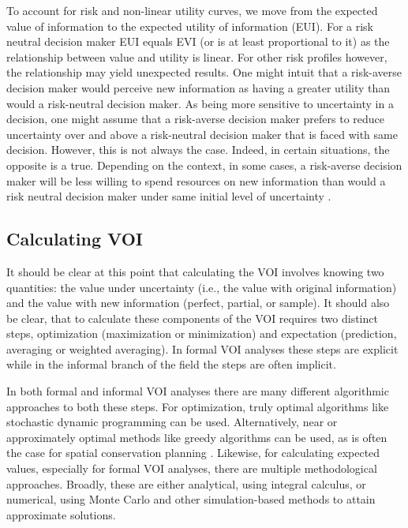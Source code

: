 \documentclass[]{article}
\theoremstyle{definition}
\theoremstyle{definition}
\theoremstyle{definition}
\theoremstyle{remark}
\begin{document}
To account for risk and non-linear utility curves, we move from the
expected value of information to the expected utility of information
(EUI). For a risk neutral decision maker EUI equals EVI (or is at least
proportional to it) as the relationship between value and utility is
linear. For other risk profiles however, the relationship may yield
unexpected results. One might intuit that a risk-averse decision maker
would perceive new information as having a greater utility than would a
risk-neutral decision maker. As being more sensitive to uncertainty in a
decision, one might assume that a risk-averse decision maker prefers to
reduce uncertainty over and above a risk-neutral decision maker that is
faced with same decision. However, this is not always the case. Indeed,
in certain situations, the opposite is a true. Depending on the context,
in some cases, a risk-averse decision maker will be less willing to
spend resources on new information than would a risk neutral decision
maker under same initial level of uncertainty \citep{Eeckhoudt2000}.

\subsection*{Calculating VOI}\label{calculating-voi}

It should be clear at this point that calculating the VOI involves
knowing two quantities: the value under uncertainty (i.e., the value
with original information) and the value with new information (perfect,
partial, or sample). It should also be clear, that to calculate these
components of the VOI requires two distinct steps, optimization
(maximization or minimization) and expectation (prediction, averaging or
weighted averaging). In formal VOI analyses these steps are explicit
while in the informal branch of the field the steps are often implicit.

In both formal and informal VOI analyses there are many different
algorithmic approaches to both these steps. For optimization, truly
optimal algorithms like stochastic dynamic programming
\citep{Johnson2014b} can be used. Alternatively, near or approximately
optimal methods like greedy algorithms \citep[e.g.,][]{Grantham2009} can
be used, as is often the case for spatial conservation planning
\citep{Moilanen2009}. Likewise, for calculating expected values,
especially for formal VOI analyses, there are multiple methodological
approaches. Broadly, these are either analytical, using integral
calculus, or numerical, using Monte Carlo and other simulation-based
methods to attain approximate solutions.
\end{document}
